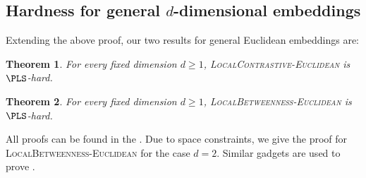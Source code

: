 \documentclass{article}
\theoremstyle{definition}  %
\theoremstyle{plain}
\newtheorem{theorem}{Theorem}
\numberwithin{observation}{section}
\numberwithin{claim}{section}
\numberwithin{fact}{section}
\numberwithin{lemma}{section}
\numberwithin{proposition}{section}
\numberwithin{theorem}{section}
\numberwithin{corollary}{section}
\numberwithin{definition}{section}
\theoremstyle{plain}
\begin{document}
\subsection{Hardness for general \texorpdfstring{$d$}{d}-dimensional embeddings}\label{sec:hardness-dd}
Extending the above proof, our two results for general Euclidean embeddings are:

\begin{theorem}\label{thm:local-contrastive-dd}
For every fixed dimension $d\ge 1$, \textsc{LocalContrastive-Euclidean} is $\PLS$-hard.
\end{theorem}

\begin{theorem}\label{thm:local-betweenness-dd}
For every fixed dimension $d\ge 1$, \textsc{LocalBetweenness-Euclidean} is $\PLS$-hard. 
\end{theorem}

All proofs can be found in the . Due to space constraints, we give the proof for \textsc{LocalBetweenness-Euclidean} for the case $d=2$.  Similar gadgets are used to prove .
\end{document}
